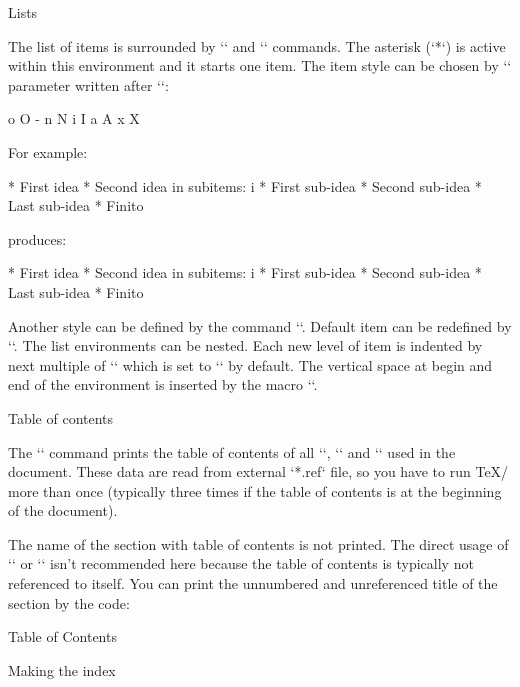\sec Lists 

The list of items is surrounded by `\begitems` and `\enditems` commands.
The asterisk (`*`) is active within this environment and it starts one item.
The item style can be chosen by `\style` parameter written after `\begitems`:

\begtt
\style o %
\style O %
\style - %
\style n %
\style N %
\style i %
\style I %
\style a %
\style A %
\style x %
\style X %
\endtt

For example:

\begtt
\begitems
* First idea
* Second idea in subitems:
  \begitems \style i
  * First sub-idea
  * Second sub-idea
  * Last sub-idea
  \enditems
* Finito
\enditems
\endtt

produces:

\begitems
* First idea
* Second idea in subitems:
  \begitems \style i
   * First sub-idea
   * Second sub-idea
   * Last sub-idea
  \enditems
* Finito
\enditems

Another style can be defined by the command ``.
Default item can be redefined by `\def\normalitem{<text>}`.
The list environments can be nested. Each new level of item is indented by
next multiple of `\iindent` which is set to `\parindent` by default.
The vertical space at begin and end of the environment is inserted by the
macro `\iiskip`.


\sec Table of contents

The `\maketoc` command prints the table of contents of all `\chap`, `\sec`
and `\secc` used in the document. These data are read from external `*.ref` file, so
you have to run \TeX/ more than once (typically three times if the table of
contents is at the beginning of the document). 

The name of the section with table of contents is not printed. The direct usage
of `\chap` or `\sec` isn't recommended here because the table of contents 
is typically not referenced to itself. You can print the unnumbered and unreferenced
title of the section by the code:

\begtt
\nonum\notoc\sec Table of Contents
\endtt


\sec Making the index 

